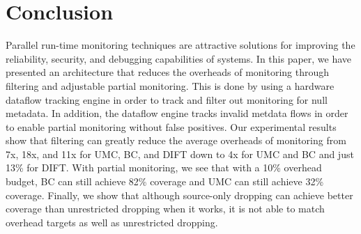 \section{Conclusion}
\label{sec:conclusion}

Parallel run-time monitoring techniques are attractive solutions for improving
the reliability, security, and debugging capabilities of systems. In this
paper, we have presented an architecture that reduces the overheads of
monitoring through filtering and adjustable partial monitoring. This is done by
using a hardware dataflow tracking engine in order to track and filter out
monitoring for null metadata. In addition, the dataflow engine tracks invalid
metdata flows in order to enable partial monitoring without false positives.
Our experimental results show that filtering can greatly reduce the average
overheads of monitoring from 7x, 18x, and 11x for UMC, BC, and DIFT down to 4x
for UMC and BC and just 13\% for DIFT. With partial monitoring, we see that
with a 10\% overhead budget, BC can still achieve 82\% coverage and UMC can
still achieve 32\% coverage. Finally, we show that although source-only dropping can
achieve better coverage than unrestricted dropping when it works, it is not
able to match overhead targets as well as unrestricted dropping.
